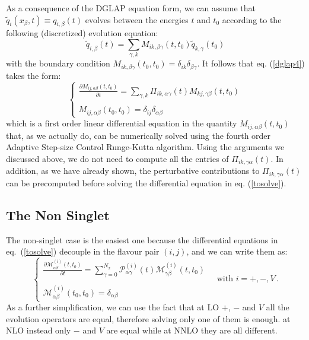 \documentclass[10pt,a4paper]{article}
\begin{document}
As a consequence of the DGLAP equation form, we can assume that $\tilde{q}_{i}(x_\beta,t)\equiv q_{i,\beta}(t)$ evolves between the energies $t$ and $t_0$ according to the following (discretized) evolution equation:
\begin{equation}
\tilde{q}_{i,\beta}(t) = \sum_{\gamma,k} M_{ik,\beta\gamma}(t,t_0)\tilde{q}_{k,\gamma}(t_0) 
\end{equation}
with the boundary condition $M_{ik,\beta\gamma}(t_0,t_0)=\delta_{ik}\delta_{\beta\gamma}$. It follows that eq. (\ref{dglap4}) takes the form:
\begin{equation}\label{tosolve}
\left\{\begin{array}{l}
\displaystyle \frac{\partial  M_{ij,\alpha\beta}(t,t_0)}{\partial t}=\sum_{\gamma,k} \Pi_{ik,\alpha\gamma}(t)M_{kj,\gamma\beta}(t,t_0)\\
\\
\displaystyle M_{ij,\alpha\beta}(t_0,t_0)=\delta_{ij}\delta_{\alpha\beta}
\end{array}\right.
\end{equation}
which is a first order linear differential equation in the quantity
$M_{ij,\alpha\beta}(t,t_0)$ that, as we actually do, can be
numerically solved using the fourth order Adaptive Step-size Control Runge-Kutta algorithm.
Using the arguments we discussed above, we do not need to compute all
the entries of $\Pi_{ik,\gamma\alpha}(t)$. In addition, as we have already shown, the
perturbative contributions to $\Pi_{ik,\gamma\alpha}(t)$ can be
precomputed before solving the differential equation in eq. (\ref{tosolve}).


\subsection{The Non Singlet}

The non-singlet case is the easiest one because the differential equations in eq.~(\ref{tosolve}) decouple in the flavour pair $(i,j)$, and we can write them as:
\begin{equation}\label{tosolveNS}
\left\{\begin{array}{l}
\displaystyle \frac{\partial  \mathcal{M}_{\alpha\beta}^{(i)}(t,t_0)}{\partial t}=\sum_{\gamma=0}^{N_x} \mathcal{P}_{\alpha\gamma}^{(i)}(t)\mathcal{M}_{\gamma\beta}^{(i)}(t,t_0)\\
\\
\displaystyle \mathcal{M}_{\alpha\beta}^{(i)}(t_0,t_0)=\delta_{\alpha\beta}
\end{array}\right.\quad\mbox{with } i=+,-,V\,.
\end{equation}
As a further simplification, we can use the fact that at LO $+$, $-$ and $V$ all the evolution operators are equal, therefore solving only one of them is enough. at NLO instead only $-$ and $V$ are equal while at NNLO they are all different.
\end{document}
